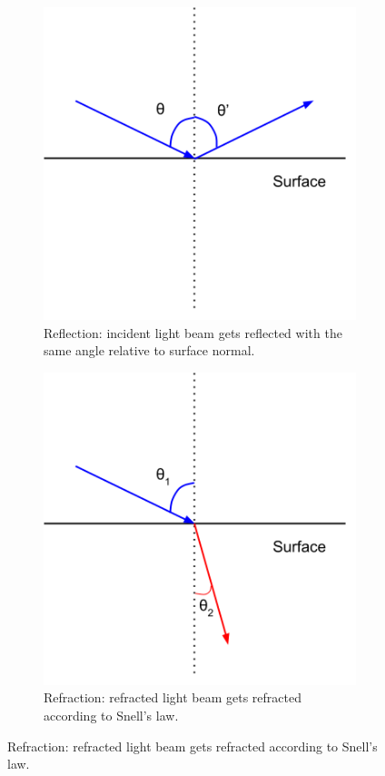 			\begin{figure}
		    \centering
		    \begin{subfigure}[t]{0.4\textwidth}
		        \includegraphics[width=\textwidth]{images/reflection.png}
		        \caption{Reflection: incident light beam gets reflected with the same angle relative to surface normal.}
		        \label{fig:reflection_def}
		    \end{subfigure}\hfill
		    \begin{subfigure}[t]{0.4\textwidth}
		        \includegraphics[width=\textwidth]{images/refraction.png}
		        \caption{Refraction: refracted light beam gets refracted according to Snell's law.}	
		        \label{fig:refracted_def}
		    \end{subfigure}%
		    

\end{figure}
